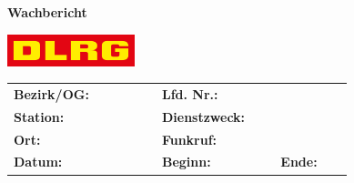 \documentclass[a4paper, notitlepage, 10pt]{scrreprt}
\newcommand{\phantomspace}{\vphantom{A}}
\begin{document}
{\LARGE\textbf{Wachbericht}}

\vspace{-2pt}\hspace{-0.5in}
\begin{minipage}[b][0pt][t]{\linewidth+0.5in+0.4in-2pt-8pt}\vspace{-51pt+8pt}\hfill\includegraphics[width=105pt]{logo}%
\end{minipage}

\begin{minipage}{\linewidth}
\renewcommand{\arraystretch}{1.55}
\begin{tabular}{>{}p{0.095\linewidth}>{}p{0.28\linewidth}>{}p{0.10\linewidth}>{}p{0.09\linewidth}
                 >{}p{0.09\linewidth}>{}p{0.09\linewidth}}
\textbf{Bezirk/OG:} & \phantomspace\uline{\hfill} & \textbf{Lfd. Nr.:} & \phantomspace\uline{\hfill} && \\
\textbf{Station:} & \phantomspace\uline{\hfill} & \textbf{Dienstzweck:} & \multicolumn{3}{p{0.27\linewidth}}{%
\parbox[t]{\linewidth}{\phantomspace\uline{\hfill}\newline{}\phantomspace\uline{\hfill}}} \\
\textbf{Ort:} & \phantomspace\uline{\hfill} & \textbf{Funkruf:} & \multicolumn{3}{p{0.27\linewidth}}{%
\parbox{\linewidth}{\phantomspace\uline{\hfill}}} \\
\textbf{Datum:} & \phantomspace\uline{\hfill} & \textbf{Beginn:} & \phantomspace\uline{\hfill} & \textbf{Ende:} &
\phantomspace\uline{\hfill} \\
\end{tabular}
\end{minipage}
\vfill
\end{document}
